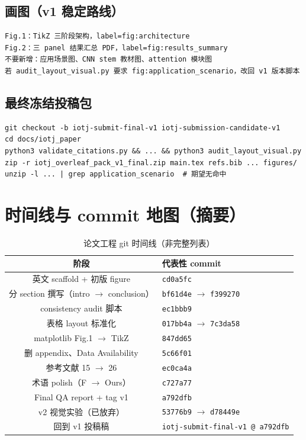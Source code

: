 \documentclass[11pt,a4paper]{ctexart}
\begin{document}
\subsection{画图（v1 稳定路线）}
\begin{verbatim}
Fig.1：TikZ 三阶段架构，label=fig:architecture
Fig.2：三 panel 结果汇总 PDF，label=fig:results_summary
不要新增：应用场景图、CNN stem 教材图、attention 模块图
若 audit_layout_visual.py 要求 fig:application_scenario，改回 v1 版本脚本
\end{verbatim}

\subsection{最终冻结投稿包}
\begin{verbatim}
git checkout -b iotj-submit-final-v1 iotj-submission-candidate-v1
cd docs/iotj_paper
python3 validate_citations.py && ... && python3 audit_layout_visual.py
zip -r iotj_overleaf_pack_v1_final.zip main.tex refs.bib ... figures/
unzip -l ... | grep application_scenario  # 期望无命中
\end{verbatim}

\section{时间线与 commit 地图（摘要）}

\begin{table}[htbp]
  \centering
  \small
  \begin{tabular}{@{}cl@{}}
    \toprule
    \textbf{阶段} & \textbf{代表性 commit} \\
    \midrule
    英文 scaffold + 初版 figure & \texttt{cd0a5fc} \\
    分 section 撰写（intro $\to$ conclusion） & \texttt{bf61d4e} $\to$ \texttt{f399270} \\
    consistency audit 脚本 & \texttt{ec1bbb9} \\
    表格 layout 标准化 & \texttt{017bb4a} $\to$ \texttt{7c3da58} \\
    matplotlib Fig.1 $\to$ TikZ & \texttt{847dd65} \\
    删 appendix、Data Availability & \texttt{5c66f01} \\
    参考文献 15 $\to$ 26 & \texttt{ec0ca4a} \\
    术语 polish（F $\to$ Ours） & \texttt{c727a77} \\
    Final QA report + tag v1 & \texttt{a792dfb} \\
    v2 视觉实验（已放弃） & \texttt{53776b9} $\to$ \texttt{d78449e} \\
    回到 v1 投稿稿 & \texttt{iotj-submit-final-v1 @ a792dfb} \\
    \bottomrule
  \end{tabular}
  \caption{论文工程 git 时间线（非完整列表）}
\end{table}
\end{document}
